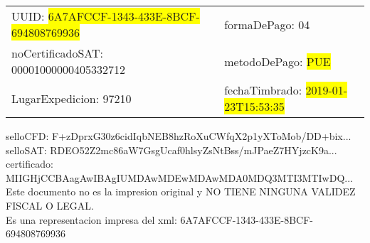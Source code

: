 \documentclass{article}
\begin{document}
\begin{tabular}{p{11cm}p{1cm}p{8cm}}
\bigskip
UUID: \colorbox{yellow}{ 6A7AFCCF-1343-433E-8BCF-694808769936 } & & formaDePago: 04\\

noCertificadoSAT: 00001000000405332712 & & metodoDePago: \colorbox{yellow}{ PUE }\\

LugarExpedicion: 97210 & & fechaTimbrado: \colorbox{yellow}{ 2019-01-23T15:53:35 } \\
\end{tabular}

\bigskip
selloCFD: F+zDprxG30z6cidIqbNEB8hzRoXuCWfqX2p1yXToMob/DD+bix... \\
selloSAT: RDEO52Z2mc86aW7GsgUcaf0hlsyZsNtBss/mJPaeZ7HYjzcK9a... \\

certificado: MIIGHjCCBAagAwIBAgIUMDAwMDEwMDAwMDA0MDQ3MTI3MTIwDQ...\bigskip\bigskip\bigskip\bigskip\bigskip\bigskip
\\Este documento no es la impresion original y NO TIENE NINGUNA VALIDEZ FISCAL O LEGAL. \\
 Es una representacion impresa del xml:  6A7AFCCF-1343-433E-8BCF-694808769936 \\
\end{document}
